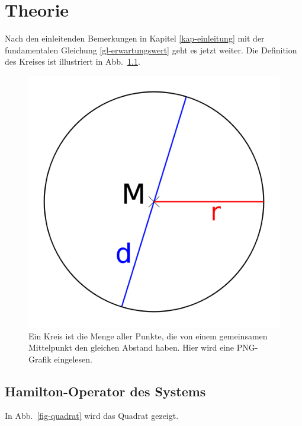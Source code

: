 \chapter{Theorie}
\label{kap-theorie}

Nach den einleitenden Bemerkungen in Kapitel \ref{kap-einleitung} mit der fundamentalen Gleichung 
 \eqref{gl-erwartungswert} geht es jetzt weiter. Die Definition des Kreises ist illustriert 
in Abb.~\ref{fig-kreis}.

\begin{figure}
\includegraphics[width=\mediumfigwidth]{bilder/kreis.png}
\caption{Ein Kreis ist die Menge aller Punkte, die von einem gemeinsamen Mittelpunkt den gleichen Abstand haben.  Hier wird eine PNG-Grafik eingelesen.}
\label{fig-kreis}
\end{figure} 

\pagebreak
\section{Hamilton-Operator des Systems}
In  Abb.~\ref{fig-quadrat} wird das Quadrat gezeigt.

